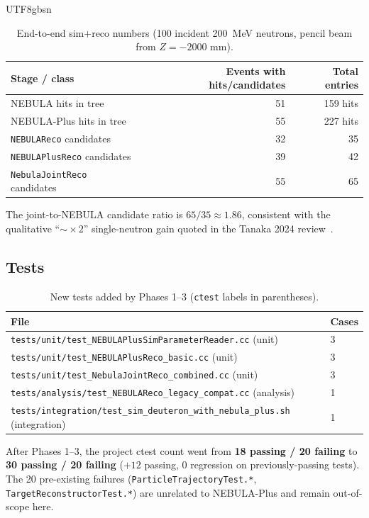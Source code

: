 \documentclass[11pt,a4paper]{article}
\newcommand{\NEB}{NEBULA}
\newcommand{\NPL}{NEBULA-Plus}
\begin{document}
\begin{CJK}{UTF8}{gbsn}
\begin{table}[h]
\centering
\caption{End-to-end sim$+$reco numbers (100 incident \SI{200}{MeV}
neutrons, pencil beam from $Z=-2000$ mm).}
\begin{tabular}{lrr}
\toprule
Stage / class & Events with hits/candidates & Total entries\\
\midrule
\NEB{}      hits in tree     & 51 & 159 hits\\
\NPL{}      hits in tree     & 55 & 227 hits\\
\midrule
\texttt{NEBULAReco}        candidates & 32 & 35\\
\texttt{NEBULAPlusReco}    candidates & 39 & 42\\
\texttt{NebulaJointReco}   candidates & 55 & 65\\
\bottomrule
\end{tabular}
\end{table}

The joint-to-NEBULA candidate ratio is $65/35\approx 1.86$, consistent with
the qualitative ``$\sim\!\times 2$'' single-neutron gain quoted in the
Tanaka 2024 review~\cite{tanaka2024}.

\subsection{Tests}

\begin{table}[h]
\centering
\caption{New tests added by Phases 1--3 (\texttt{ctest} labels in
parentheses).}
\begin{tabular}{ll}
\toprule
File & Cases\\
\midrule
\texttt{tests/unit/test\_NEBULAPlusSimParameterReader.cc}    (unit)         & 3 \\
\texttt{tests/unit/test\_NEBULAPlusReco\_basic.cc}            (unit)         & 3 \\
\texttt{tests/unit/test\_NebulaJointReco\_combined.cc}        (unit)         & 3 \\
\texttt{tests/analysis/test\_NEBULAReco\_legacy\_compat.cc}   (analysis)     & 1 \\
\texttt{tests/integration/test\_sim\_deuteron\_with\_nebula\_plus.sh} (integration) & 1 \\
\bottomrule
\end{tabular}
\end{table}

After Phases 1--3, the project ctest count went from
\textbf{18 passing / 20 failing} to \textbf{30 passing / 20 failing}
($+12$ passing, $0$ regression on previously-passing tests). The 20
pre-existing failures (\texttt{ParticleTrajectoryTest.*},
\texttt{TargetReconstructorTest.*}) are unrelated to \NPL{} and remain
out-of-scope here.


\end{CJK}
\end{document}
